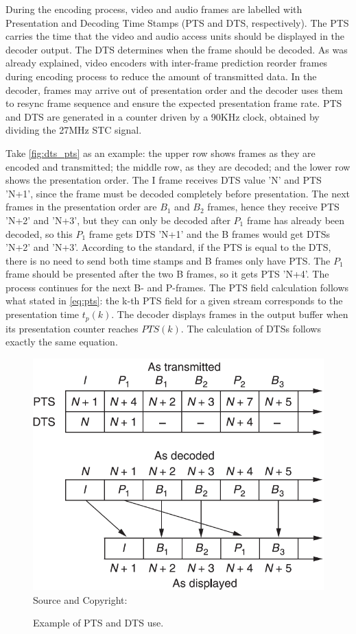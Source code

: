 \documentclass[
	12pt,				%
	openright,			%
	twoside,			%
	a4paper,			%
	brazil,
	french,				%
	english
	]{abntex2}
\begin{document}
During the encoding process, video and audio frames are labelled with Presentation and Decoding Time Stamps (PTS and DTS, respectively). The PTS carries the time that the video and audio access units should be displayed in the decoder output. The DTS determines when the frame should be decoded. As was already explained, video encoders with inter-frame prediction reorder frames during encoding process to reduce the amount of transmitted data. In the decoder, frames may arrive out of presentation order and the decoder uses them to resync frame sequence and ensure the expected presentation frame rate. PTS and DTS are generated in a counter driven by a 90KHz clock, obtained by dividing the 27MHz STC signal.

Take \autoref{fig:dts_pts} as an example: the upper row shows frames as they are encoded and transmitted; the middle row, as they are decoded; and the lower row shows the presentation order. The I frame receives DTS value 'N' and PTS 'N+1', since the frame must be decoded completely before presentation. The next frames in the presentation order are $B_1$ and $B_2$ frames, hence they receive PTS 'N+2' and 'N+3', but they can only be decoded after $P_1$ frame has already been decoded, so this $P_1$ frame gets DTS 'N+1' and the B frames would get DTSs 'N+2' and 'N+3'. According to the standard, if the PTS is equal to the DTS, there is no need to send both time stamps and B frames only have PTS. The $P_1$ frame should be presented after the two B frames, so it gets PTS 'N+4'. The process continues for the next B- and P-frames. The PTS field calculation follows what stated in \autoref{eq:pts}: the k-th PTS field for a given stream corresponds to the presentation time $t_p(k)$. The decoder displays frames in the output buffer when its presentation counter reaches $PTS(k)$. The calculation of DTSs follows exactly the same equation.

\begin{figure}[!hb]
\centering
\caption{Example of PTS and DTS use.}
\includegraphics[width=0.5\linewidth]{figuras/dts_pts_2.png}
\\Source and Copyright: \cite{watkinson}
\label{fig:dts_pts}
\end{figure}
\end{document}
